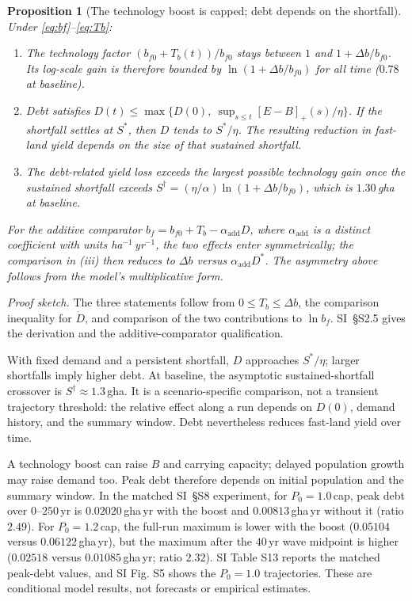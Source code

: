 \documentclass[preprint,12pt,authoryear]{elsarticle}
\newtheorem{proposition}{Proposition}
\newcommand{\pos}[1]{\left[#1\right]_+}
\begin{document}
\begin{proposition}[The technology boost is capped; debt depends on the shortfall]\label{prop:bounded}
Under \eqref{eq:bf}--\eqref{eq:Tb}:
\begin{enumerate}[label=(\roman*)]
\item The technology factor $(b_{f0}+T_b(t))/b_{f0}$ stays between $1$ and $1+\Delta b/b_{f0}$. Its log-scale gain is therefore bounded by $\ln(1+\Delta b/b_{f0})$ for all time ($0.78$ at baseline).
\item Debt satisfies $D(t)\le\max\{D(0),\ \sup_{s\le t}\pos{E-B}(s)/\eta\}$. If the shortfall settles at $S^*$, then $D$ tends to $S^*/\eta$. The resulting reduction in fast-land yield depends on the size of that sustained shortfall.
\item The debt-related yield loss exceeds the largest possible technology gain once the sustained shortfall exceeds $S^\dagger=(\eta/\alpha)\ln(1+\Delta b/b_{f0})$, which is $1.30$\,gha at baseline.
\end{enumerate}
For the additive comparator $b_f=b_{f0}+T_b-\alpha_{\mathrm{add}}D$, where $\alpha_{\mathrm{add}}$ is a distinct coefficient with units ha$^{-1}$\,yr$^{-1}$, the two effects enter symmetrically; the comparison in (iii) then reduces to $\Delta b$ versus $\alpha_{\mathrm{add}}D^*$. The asymmetry above follows from the model's multiplicative form.
\end{proposition}

\noindent\emph{Proof sketch.} The three statements follow from $0\le T_b\le\Delta b$, the comparison inequality for $\dot D$, and comparison of the two contributions to $\ln b_f$. SI~\S S2.5 gives the derivation and the additive-comparator qualification.

With fixed demand and a persistent shortfall, $D$ approaches $S^*/\eta$; larger shortfalls imply higher debt. At baseline, the asymptotic sustained-shortfall crossover is $S^\dagger\approx1.3$\,gha. It is a scenario-specific comparison, not a transient trajectory threshold: the relative effect along a run depends on $D(0)$, demand history, and the summary window. Debt nevertheless reduces fast-land yield over time.

A technology boost can raise $B$ and carrying capacity; delayed population growth may raise demand too. Peak debt therefore depends on initial population and the summary window. In the matched SI~\S S8 experiment, for $P_0=1.0$\,cap, peak debt over $0$--$250$\,yr is $0.02020$\,gha\,yr with the boost and $0.00813$\,gha\,yr without it (ratio $2.49$). For $P_0=1.2$\,cap, the full-run maximum is lower with the boost ($0.05104$ versus $0.06122$\,gha\,yr), but the maximum after the $40$\,yr wave midpoint is higher ($0.02518$ versus $0.01085$\,gha\,yr; ratio $2.32$). SI Table S13 reports the matched peak-debt values, and SI Fig. S5 shows the $P_0=1.0$ trajectories. These are conditional model results, not forecasts or empirical estimates.
\end{document}
